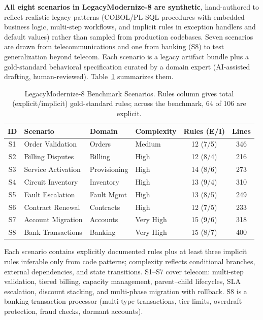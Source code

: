 \documentclass[conference]{IEEEtran}
\begin{document}
\textbf{All eight scenarios in LegacyModernize-8 are synthetic}, hand-authored to reflect realistic legacy patterns (COBOL/PL-SQL procedures with embedded business logic, multi-step workflows, and implicit rules in exception handlers and default values) rather than sampled from production codebases. Seven scenarios are drawn from telecommunications and one from banking (S8) to test generalization beyond telecom. Each scenario is a legacy artifact bundle plus a gold-standard behavioral specification curated by a domain expert (AI-assisted drafting, human-reviewed). Table~\ref{tab:benchmark} summarizes them.

\begin{table}[htbp]
\caption{LegacyModernize-8 Benchmark Scenarios. Rules column gives total (explicit/implicit) gold-standard rules; across the benchmark, 64 of 106 are explicit.}
\label{tab:benchmark}
\centering
\footnotesize
\begin{tabular}{@{}clllcc@{}}
\toprule
\textbf{ID} & \textbf{Scenario} & \textbf{Domain} & \textbf{Complexity} & \textbf{Rules (E/I)} & \textbf{Lines} \\
\midrule
S1 & Order Validation & Orders & Medium & 12 (7/5) & 346 \\
S2 & Billing Disputes & Billing & High & 12 (8/4) & 216 \\
S3 & Service Activation & Provisioning & High & 14 (8/6) & 273 \\
S4 & Circuit Inventory & Inventory & High & 13 (9/4) & 310 \\
S5 & Fault Escalation & Fault Mgmt & High & 13 (8/5) & 249 \\
S6 & Contract Renewal & Contracts & High & 12 (7/5) & 233 \\
S7 & Account Migration & Accounts & Very High & 15 (9/6) & 318 \\
S8 & Bank Transactions & Banking & Very High & 15 (8/7) & 400 \\
\bottomrule
\end{tabular}
\end{table}

Each scenario contains explicitly documented rules plus at least three implicit rules inferable only from code patterns; complexity reflects conditional branches, external dependencies, and state transitions. S1--S7 cover telecom: multi-step validation, tiered billing, capacity management, parent--child lifecycles, SLA escalation, discount stacking, and multi-phase migration with rollback. S8 is a banking transaction processor (multi-type transactions, tier limits, overdraft protection, fraud checks, dormant accounts).
\end{document}
